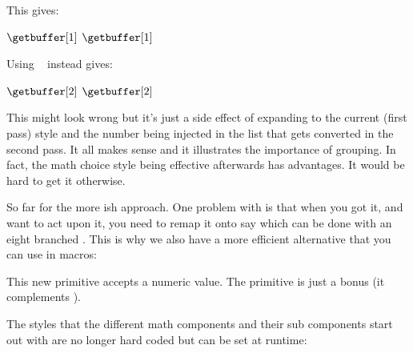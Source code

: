 \typebuffer[1]

This gives:

\blank $\displaystyle \getbuffer[1]$ \blank
\blank $\textstyle    \getbuffer[1]$ \blank

Using \type {\begingroup} \unknown\ \type {\endgroup} instead gives:

\blank $\displaystyle \getbuffer[2]$ \blank
\blank $\textstyle    \getbuffer[2]$ \blank

This might look wrong but it's just a side effect of \type {\mathstyle} expanding
to the current (first pass) style and the number being injected in the list that
gets converted in the second pass. It all makes sense and it illustrates the
importance of grouping. In fact, the math choice style being effective afterwards
has advantages. It would be hard to get it otherwise.

So far for the more \LUATEX ish approach. One problem with \type {\mathstyle} is
that when you got it, and want to act upon it, you need to remap it onto say \type
{\scriptstyle} which can be done with an eight branched \type {\ifcase}. This is
why we also have a more efficient alternative that you can use in macros:

\starttyping
{}
\stoptyping

This new primitive \typ {\givenmathstyle} accepts a numeric value. The \typ
{\mathstackstyle} primitive is just a bonus (it complements \type {\mathstack}).

The styles that the different math components and their sub components start out
with are no longer hard coded but can be set at runtime:

